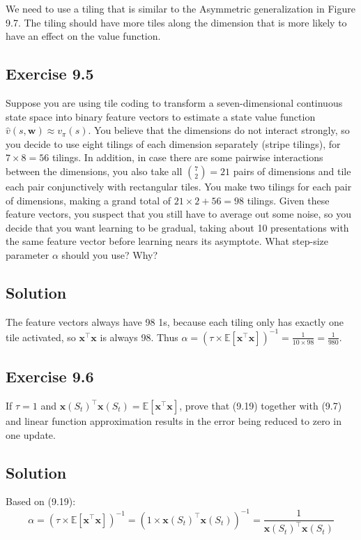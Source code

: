 We need to use a tiling that is similar to the Asymmetric generalization in Figure 9.7. The tiling should have more tiles along the dimension that is more likely to have an effect on the value function.

\subsection*{Exercise 9.5}
Suppose you are using tile coding to transform a seven-dimensional continuous
state space into binary feature vectors to estimate a state value function $\hat{v}(s, \mathbf{w}) \approx v_\pi(s)$.
You believe that the dimensions do not interact strongly, so you decide to use eight tilings
of each dimension separately (stripe tilings), for $7 \times 8 = 56$ tilings. In addition, in case
there are some pairwise interactions between the dimensions, you also take all  ${{7}\choose{2}} = 21$
pairs of dimensions and tile each pair conjunctively with rectangular tiles. You make
two tilings for each pair of dimensions, making a grand total of $21 \times 2 + 56 = 98$ tilings.
Given these feature vectors, you suspect that you still have to average out some noise,
so you decide that you want learning to be gradual, taking about 10 presentations with
the same feature vector before learning nears its asymptote. What step-size parameter $\alpha$
should you use? Why?

\subsection*{Solution}
The feature vectors always have 98 1s, because each tiling only has exactly one tile activated, so $\mathbf{x}^\top \mathbf{x}$ is always 98. Thus $\alpha = \left(\tau \times \mathbb{E}[\mathbf{x}^\top \mathbf{x}]\right)^{-1} = \frac{1}{10 \times 98} = \frac{1}{980}$.

\subsection*{Exercise 9.6}
If $\tau = 1$ and $\mathbf{x}(S_t)^\top \mathbf{x}(S_t) = \mathbb{E}[\mathbf{x}^\top \mathbf{x}]$, prove that (9.19) together with (9.7)
and linear function approximation results in the error being reduced to zero in one update.

\subsection*{Solution}
Based on (9.19):
\[
    \alpha = \left( \tau \times \mathbb{E}[\mathbf{x}^\top \mathbf{x}] \right)^{-1} = \left( 1 \times \mathbf{x}(S_t)^\top \mathbf{x}(S_t) \right)^{-1} = \frac{1}{\mathbf{x}(S_t)^\top \mathbf{x}(S_t)}
\]

